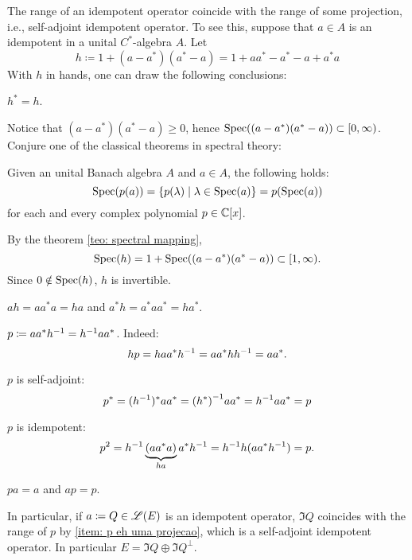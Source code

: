 \begin{observacao}\label{obs: idempotente gerando inversivel}
    The range of an idempotent operator coincide with the range of some projection, i.e., self-adjoint idempotent operator. To see this, suppose that $a\in A$ is an idempotent in a unital $C^*$-algebra $A$.  Let
    \[
    h \coloneqq 1 + (a-a^*)(a^*-a) = 1 + aa^* - a^* - a + a^*a
    \]
    With $h$ in hands, one can draw the following conclusions: 
    
    \begin{itroman}
        \item $h^* = h$.
        \item Notice that $(a-a^*)(a^*-a) \geqslant 0$, hence $\operatorname{Spec}((a-a^*)(a^*-a)) \subset [0,\infty)$. Conjure one of the classical theorems in spectral theory:        
        \begin{invocacao}
            \label{teo: spectral mapping}
            Given an unital Banach algebra $A$ and $a\in A$, the following holds:
            \begin{equation*}
                \operatorname{Spec}(p(a)) = \{p(\lambda) \mid \lambda \in \operatorname{Spec}(a)\} = p(\operatorname{Spec}(a))
            \end{equation*}
            for each and every complex polynomial $p \in \operatorname{\mathbb{C}}[x]$.
        \end{invocacao}
        By the theorem \ref{teo: spectral mapping}, 
        \begin{equation*}
            \operatorname{Spec}(h) = 1 + \operatorname{Spec}((a-a^*)(a^*-a)) \subset [1,\infty).
        \end{equation*}
        Since $0 \notin \operatorname{Spec}(h)$, $h$ is invertible.
        \item $ah = aa^*a = ha$ and $a^*h =  a^*aa^* =ha^*$.
        \item $p \coloneqq aa^*h^{-1} = {h}^{-1}aa^*$. Indeed:
        \[
        hp = haa^*{h}^{-1} = aa^*h{h}^{-1} = aa^*.
        \]
        \item $p$ is self-adjoint:
        \[
        p^* = ({h}^{-1})^*aa^* = {(h^*)}^{-1}aa^* = {h}^{-1}aa^* = p
        \]
        \item $p$ is idempotent:
        \[
        p^2 = {h}^{-1}\underbrace{(aa^*a)}_{ha}a^*{h}^{-1} = {h}^{-1}h(aa^* {h}^{-1}) = p.
        \]
        
        \item \label{item: p eh uma projecao} $pa = a$ and $ap= p$. 
    \end{itroman}
    
    In particular, if $a\coloneqq Q\in \mathscr L(E)$ is an idempotent operator, $\Im Q$ coincides with the range of $p$ by \ref{item: p eh uma projecao}, which is a self-adjoint idempotent operator. In particular $E = \Im Q \oplus \Im Q^{\perp}$.
\end{observacao}


